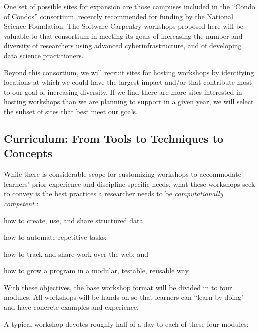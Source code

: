 \documentclass{proposalnsf}
\newlength{\up}
\begin{document}
One set of possible sites for expansion are those campuses included in
the ``Condo of Condos'' consortium, recently recommended for funding
by the National Science Foundation.  The Software Carpentry workshops
proposed here will be valuable to that consortium in meeting its goals
of increasing the number and diversity of researchers using advanced
cyberinfrastructure, and of developing data science practitioners.

Beyond this consortium, we will recruit sites for hosting workshops by identifying locations at which we could have the largest impact and/or that contribute most to our goal of increasing diversity. If we find there are more sites interested in hosting workshops than we are planning to support in a given year, we will select the subset of sites that best meet our goals.

\subsection{Curriculum: From Tools to Techniques to Concepts}

While there is considerable scope for customizing workshops to
accommodate learners' prior experience and discipline-specific needs,
what these workshops seek to convey is the best
practices a researcher needs to be \emph{computationally competent}
\cite{wilson2013}:

\begin{compactitem}
\item
  how to create, use, and share structured data
\item
  how to automate repetitive tasks; 
\item
  how to track and share work over the web; and
\item
  how to grow a program in a modular, testable, reusable way.
\end{compactitem}

With these objectives, the base workshop format will be divided in to four modules.  All workshops will be hands-on so that learners can ``learn by doing" and have concrete examples and experience.  

A typical workshop devotes roughly half of a day to each of these four modules:
\end{document}
